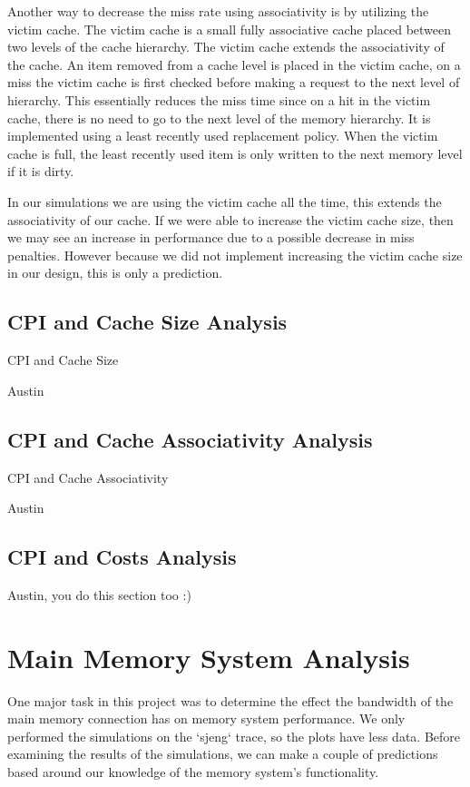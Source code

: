 \documentclass{article}
\begin{document}
Another way to decrease the miss rate using associativity is by utilizing the victim cache. The victim cache is a small fully associative cache placed between two levels of the cache hierarchy. The victim cache extends the associativity of the cache. An item removed from a cache level is placed in the victim cache, on a miss the victim cache is first checked before making a request to the next level of hierarchy. This essentially reduces the miss time since on a hit in the victim cache, there is no need to go to the next level of the memory hierarchy. It is implemented using a least recently used replacement policy. When the victim cache is full, the least recently used item is only written to the next memory level if it is dirty. 

In our simulations we are using the victim cache all the time, this extends the associativity of our cache. If we were able to increase the victim cache size, then we may see an increase in performance due to a possible decrease in miss penalties. However because we did not implement increasing the victim cache size in our design, this is only a prediction. 

\subsection{CPI and Cache Size Analysis}

CPI and Cache Size

Austin

\subsection{CPI and Cache Associativity Analysis}

CPI and Cache Associativity

Austin

\subsection{CPI and Costs Analysis}

Austin, you do this section too :)

\section{Main Memory System Analysis}

One major task in this project was to determine the effect the bandwidth of the
main memory connection has on memory system performance. We only performed the
simulations on the `sjeng` trace, so the plots have less data. Before examining
the results of the simulations, we can make a couple of predictions based around
our knowledge of the memory system's functionality.
\end{document}
